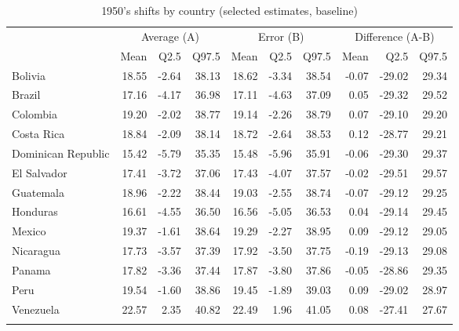\renewcommand{\arraystretch}{1.2}
\setlength{\tabcolsep}{10pt}
\begin{table}[htp]
\centering
\caption{1950's shifts by country (selected estimates, baseline)} 
\label{tab:tshift_1950}
\scriptsize
\begin{tabular}{lrrrrrrrrr}
  \hline
  \addlinespace
    & \multicolumn{3}{c}{Average (A)}  & \multicolumn{3}{c}{Error (B)} & \multicolumn{3}{c}{Difference (A-B)}  \\
    \cmidrule(lr){2-4}\cmidrule(lr){5-7}\cmidrule(lr){8-10}
 & Mean & Q2.5 & Q97.5 & Mean & Q2.5 & Q97.5 & Mean & Q2.5 & Q97.5 \\ 
 \addlinespace
  \hline
\addlinespace 
Bolivia & 18.55 & -2.64 & 38.13 & 18.62 & -3.34 & 38.54 & -0.07 & -29.02 & 29.34 \\ 
  Brazil & 17.16 & -4.17 & 36.98 & 17.11 & -4.63 & 37.09 & 0.05 & -29.32 & 29.52 \\ 
  Colombia & 19.20 & -2.02 & 38.77 & 19.14 & -2.26 & 38.79 & 0.07 & -29.10 & 29.20 \\ 
  Costa Rica & 18.84 & -2.09 & 38.14 & 18.72 & -2.64 & 38.53 & 0.12 & -28.77 & 29.21 \\ 
  Dominican Republic & 15.42 & -5.79 & 35.35 & 15.48 & -5.96 & 35.91 & -0.06 & -29.30 & 29.37 \\ 
  El Salvador & 17.41 & -3.72 & 37.06 & 17.43 & -4.07 & 37.57 & -0.02 & -29.51 & 29.57 \\ 
  Guatemala & 18.96 & -2.22 & 38.44 & 19.03 & -2.55 & 38.74 & -0.07 & -29.12 & 29.25 \\ 
  Honduras & 16.61 & -4.55 & 36.50 & 16.56 & -5.05 & 36.53 & 0.04 & -29.14 & 29.45 \\ 
  Mexico & 19.37 & -1.61 & 38.64 & 19.29 & -2.27 & 38.95 & 0.09 & -29.12 & 29.05 \\ 
  Nicaragua & 17.73 & -3.57 & 37.39 & 17.92 & -3.50 & 37.75 & -0.19 & -29.13 & 29.08 \\ 
  Panama & 17.82 & -3.36 & 37.44 & 17.87 & -3.80 & 37.86 & -0.05 & -28.86 & 29.35 \\ 
  Peru & 19.54 & -1.60 & 38.86 & 19.45 & -1.89 & 39.03 & 0.09 & -29.02 & 28.97 \\ 
  Venezuela & 22.57 & 2.35 & 40.82 & 22.49 & 1.96 & 41.05 & 0.08 & -27.41 & 27.67 \\ 
    \addlinespace
\hline
\end{tabular}
\end{table}
